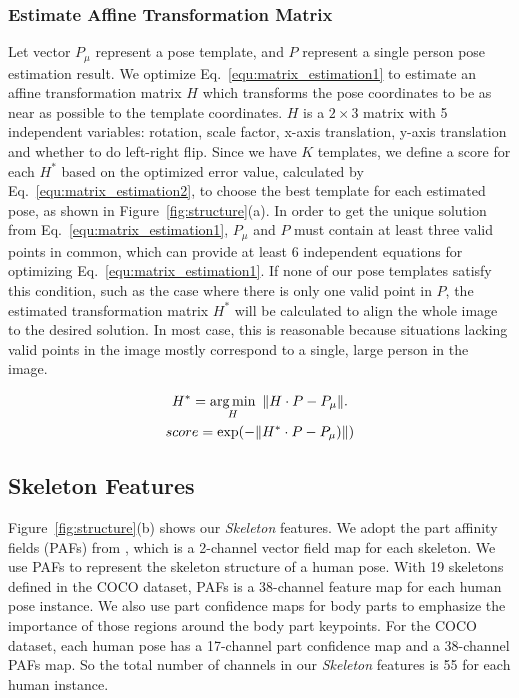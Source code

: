 \documentclass[10pt,twocolumn,letterpaper]{article}
\begin{document}
\subsubsection{Estimate Affine Transformation Matrix}
Let vector $P_{\mu}$ represent a pose template, and $P$ represent a single person pose estimation result. We optimize
Eq.~\ref{equ:matrix_estimation1} to estimate an affine transformation matrix $H$ which transforms the pose coordinates to be as near as possible to the template coordinates. $H$ is a $2\times3$ matrix with 5 independent variables: rotation, scale factor, x-axis translation, y-axis translation and whether to do left-right flip. Since we have $K$ templates, we define a score for each $H^*$ based on the optimized error value, calculated by Eq.~\ref{equ:matrix_estimation2}, to choose the best template for each estimated pose, as shown in Figure~\ref{fig:structure}(a). In order to get the unique solution from Eq.~\ref{equ:matrix_estimation1}, $P_\mu$ and $P$ must contain at least three valid points in common, which can provide at least 6 independent equations for optimizing Eq.~\ref{equ:matrix_estimation1}. If none of our pose templates satisfy this condition, such as the case where there is only one valid point in $P$, the estimated transformation matrix $H^*$ will be calculated to align the whole image to the desired solution. In most case, this is reasonable because situations lacking valid points in the image mostly correspond to a single, large person in the image. 

\vspace{-0.4cm}
\begin{gather}
\small
\label{equ:matrix_estimation1}
H^{*} = \mathop{\arg\min}_{H} \ \| H\cdot P-P_{\mu} \|. \\
\label{equ:matrix_estimation2}
score = \exp( - \| H^{*}\cdot P - P_{\mu}) \| )
\end{gather}


\subsection{Skeleton Features}
\label{sec:Skel}
Figure~\ref{fig:structure}(b) shows our \emph{Skeleton} features. We adopt the part affinity fields (PAFs) from \cite{cao2017realtime}, which is a 2-channel vector field map for each skeleton. We use PAFs to represent the skeleton structure of a human pose. With 19 skeletons defined in the COCO dataset, PAFs is a 38-channel feature map for each human pose instance. We also use part confidence maps for body parts to emphasize the importance of those regions around the body part keypoints. For the COCO dataset, each human pose has a 17-channel part confidence map and a 38-channel PAFs map. So the total number of channels in our \emph{Skeleton} features is 55 for each human instance.
\end{document}
